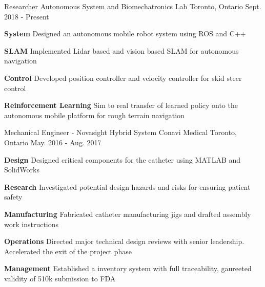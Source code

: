 \begin{cventries}
	\cventry
	{Researcher}
	{Autonomous System and Biomechatronics Lab}
	{Toronto, Ontario}
	{Sept. 2018 - Present}
	{
		\begin{cvitems}
			\item {
				\textbf{System} Designed an autonomous mobile robot system using ROS and C++
			}
			\item {
				\textbf{SLAM} Implemented Lidar based and vision based SLAM for autonomous navigation
			}
			\item {
				\textbf{Control} Developed position controller and velocity controller for skid steer control
			}
			\item {
				\textbf{Reinforcement Learning} Sim to real transfer of learned policy onto the autonomous mobile platform for rough terrain navigation
			}
		\end{cvitems}
	}
	\cventry
	{Mechanical Engineer - Novasight Hybrid System}
	{Conavi Medical} 
	{Toronto, Ontario}
	{May. 2016 - Aug. 2017}
	{
		\begin{cvitems}
			\item {
				\textbf{Design} Designed critical components for the catheter using MATLAB and SolidWorks
			}
			\item {
				\textbf{Research} Investigated potential design hazards and risks for ensuring patient safety
			}
			\item {
				\textbf{Manufacturing} Fabricated catheter manufacturing jigs and drafted assembly work instructions
			}
			\item {
				\textbf{Operations} Directed major technical design reviews with senior leadership. Accelerated the exit of the project phase
			}
			\item {
				\textbf{Management} Established a inventory system with full traceability, gaureeted validity of 510k submission to FDA
			}
		\end{cvitems}
	}  
\end{cventries}
